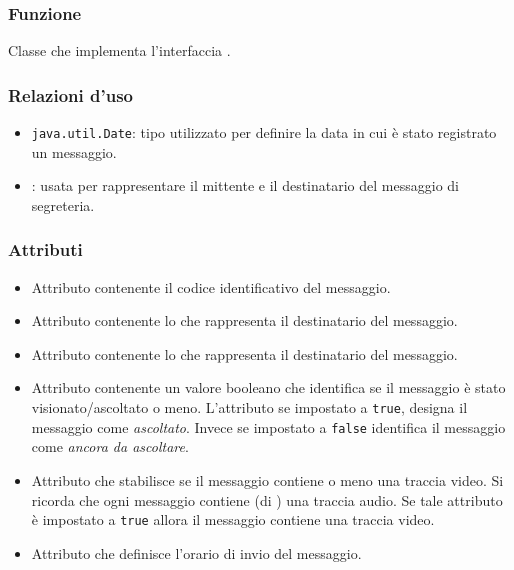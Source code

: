 
\subsubsection*{Funzione}
Classe che implementa l'interfaccia .

\subsubsection*{Relazioni d'uso}
\begin{itemize}
	\item \texttt{java.util.Date}: tipo utilizzato per definire la data in cui è stato registrato un messaggio.
	\item {}: usata per rappresentare il mittente e il destinatario del messaggio di segreteria.
\end{itemize}

\subsubsection*{Attributi}

\begin{itemize}
	\item{}
	Attributo contenente il codice identificativo del messaggio.
	\item{}
	Attributo contenente lo  che rappresenta il destinatario del messaggio.
	\item{}
	Attributo contenente lo  che rappresenta il destinatario del messaggio.
	\item{}
	Attributo contenente un valore booleano che identifica se il messaggio è stato visionato/ascoltato o meno. L'attributo se impostato a \texttt{true}, designa il messaggio come \textit{ascoltato}. Invece se impostato a \texttt{false} identifica il messaggio come \textit{ancora da ascoltare}.
	\item{}
	Attributo che stabilisce se il messaggio contiene o meno una traccia video. Si ricorda che ogni messaggio contiene (di ) una traccia audio. Se tale attributo è impostato a \texttt{true} allora il messaggio contiene una traccia video.
	\item{}
	Attributo che definisce l'orario di invio del messaggio.
\end{itemize}

